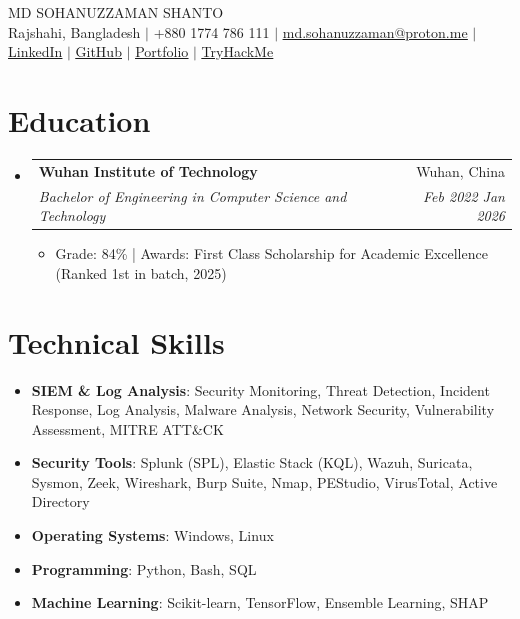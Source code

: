\documentclass[letterpaper,11pt]{article}
\makeatletter
\newcommand{\resumeItem}[1]{
  \item\small{#1}
}
\newcommand{\resumeSubheading}[4]{
  \vspace{-2pt}\item
    \begin{tabular*}{0.97\textwidth}[t]{l@{\extracolsep{\fill}}r}
      \textbf{#1} & #2 \\
      \textit{\small#3} & \textit{\small #4} \\
    \end{tabular*}\vspace{-7pt}
}
\newcommand{\resumeSubHeadingListStart}{\begin{itemize}[leftmargin=0.15in, label={}]}
\newcommand{\resumeSubHeadingListEnd}{\end{itemize}}
\newcommand{\resumeItemListStart}{\begin{itemize}}
\newcommand{\resumeItemListEnd}{\end{itemize}\vspace{-5pt}}
\makeatother
\begin{document}

\begin{center}
    {\Huge \textsc{MD SOHANUZZAMAN SHANTO}} \\
    \vspace{6pt}
    {\small Rajshahi, Bangladesh $|$ +880 1774 786 111 $|$ \href{mailto:md.sohanuzzaman@proton.me}{\underline{md.sohanuzzaman@proton.me}} $|$ \href{https://linkedin.com/in/sohanuzzaman3301}{\underline{LinkedIn}} $|$ \href{https://github.com/sohanuzzaman3301}{\underline{GitHub}} $|$ \href{https://sohanuzzaman3301.github.io}{\underline{Portfolio}} $|$ \href{https://tryhackme.com/p/HiddenV1rus}{\underline{TryHackMe}}}
\end{center}
\section{Education}
\resumeSubHeadingListStart%
\resumeSubheading%
{Wuhan Institute of Technology}{Wuhan, China}
{Bachelor of Engineering in Computer Science and Technology}{Feb 2022 \- Jan 2026}
\resumeItemListStart%
\resumeItem{Grade: 84\% | Awards: First Class Scholarship for Academic Excellence (Ranked 1st in batch, 2025)}
\resumeItemListEnd%
\resumeSubHeadingListEnd%
%
\section{Technical Skills}
\begin{itemize}[leftmargin=0.15in, label={}]
\small
\item{\textbf{SIEM \& Log Analysis}: Security Monitoring, Threat Detection, Incident Response, Log Analysis, Malware Analysis, Network Security, Vulnerability Assessment, MITRE ATT\&CK}
\item{\textbf{Security Tools}: Splunk (SPL), Elastic Stack (KQL), Wazuh, Suricata, Sysmon, Zeek, Wireshark, Burp Suite, Nmap, PEStudio, VirusTotal, Active Directory}
\item{\textbf{Operating Systems}: Windows, Linux}
\item{\textbf{Programming}: Python, Bash, SQL}
\item{\textbf{Machine Learning}: Scikit-learn, TensorFlow, Ensemble Learning, SHAP}
\end{itemize}
%
\end{document}
